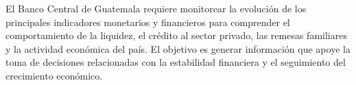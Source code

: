 El Banco Central de Guatemala requiere monitorear la evolución de los principales indicadores monetarios y financieros para comprender el comportamiento de la liquidez, el crédito al sector privado, las remesas familiares y la actividad económica del país. El objetivo es generar información que apoye la toma de decisiones relacionadas con la estabilidad financiera y el seguimiento del crecimiento económico.